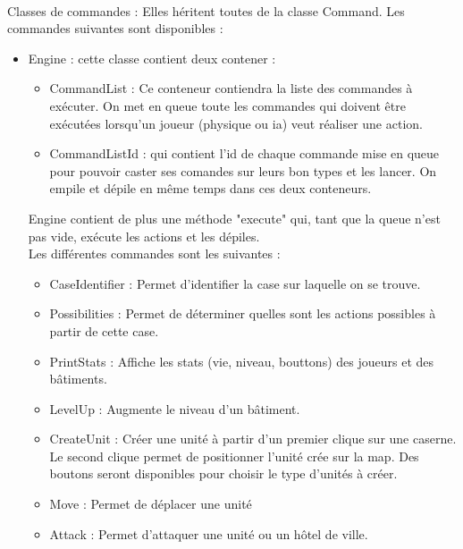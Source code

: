 \documentclass[12pt,a4paper]{article}
\begin{document}
\\Classes de commandes : Elles héritent toutes de la classe Command. Les commandes suivantes sont disponibles :
\begin{itemize}
\item Engine : cette classe contient deux contener : \begin{itemize}
    \item CommandList : Ce conteneur contiendra la liste des commandes à exécuter. On met en queue toute les commandes qui doivent être exécutées lorsqu'un joueur (physique ou ia) veut réaliser une action.
    \item CommandListId : qui contient l'id de chaque commande mise en queue pour pouvoir caster ses comandes sur leurs bon types et les lancer. On empile et dépile en même temps dans ces deux conteneurs. 
\end{itemize}
Engine contient de plus une méthode "execute" qui, tant que la queue n'est pas vide, exécute les actions et les dépiles. 
\\Les différentes commandes sont les suivantes : 
    \begin{itemize}
        \item CaseIdentifier : Permet d'identifier la case sur laquelle on se trouve.
        \item Possibilities : Permet de déterminer quelles sont les actions possibles à partir de cette case.
        \item PrintStats : Affiche les stats (vie, niveau, bouttons) des joueurs et des bâtiments.
        \item LevelUp : Augmente le niveau d'un bâtiment.
        \item CreateUnit : Créer une unité à partir d'un premier clique sur une caserne. Le second clique permet de positionner l'unité crée sur la map. Des boutons seront disponibles pour choisir le type d'unités à créer.
        \item Move : Permet de déplacer une unité
        \item Attack : Permet d'attaquer une unité ou un hôtel de ville.
    \end{itemize}
\end{itemize}
\end{document}
